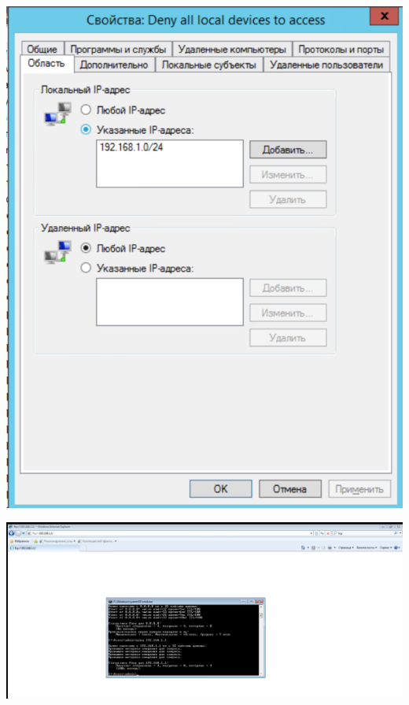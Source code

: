\documentclass[a4paper,14pt]{extarticle}
\begin{document}
    \begin{center}
        \includegraphics[scale=0.7]{6.2.2.png}
    \end{center}

    \begin{center}
        \includegraphics[scale=0.4]{6.2.3.png}
    \end{center}
\end{document}
